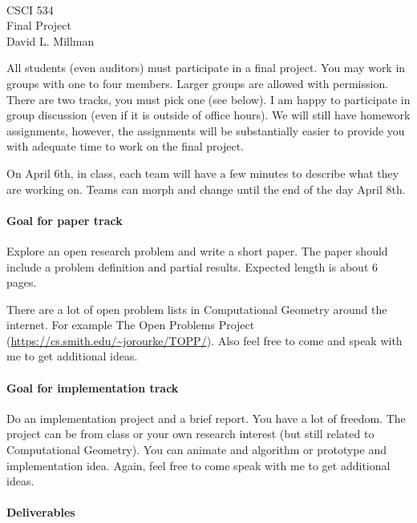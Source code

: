 \documentclass[11pt]{article}
\newcommand{\course}{CSCI 534}
\newcommand{\proj}{Final Project}
\newcommand{\instructor}{David L. Millman}
\begin{document}
{ ~\\
    \course \\ 
    \proj \\ 
    \instructor
    \vspace{1em}
}

All students (even auditors) must participate in a final project.  You may work
in groups with one to four members. Larger groups are allowed with permission.
There are two tracks, you must pick one (see below).  I am happy to participate
in group discussion (even if it is outside of office hours).  We will still have
homework assignments, however, the assignments will be substantially easier to
provide you with adequate time to work on the final project.

On April 6th, in class, each team will have a few minutes to describe what they
are working on. Teams can morph and change until the end of the day April 8th.

\paragraph{Goal for paper track} Explore an open research problem and write a
short paper.  The paper should include a problem definition and partial results.
Expected length is about 6 pages.

There are a lot of open problem lists in Computational Geometry around the
internet.  For example The Open Problems Project
(\url{https://cs.smith.edu/~jorourke/TOPP/}). Also feel free to come and speak
with me to get additional ideas.


\paragraph{Goal for implementation track} Do an implementation project and a
brief report.  You have a lot of freedom.  The project can be from class or your
own research interest (but still related to Computational Geometry).  You can
animate and algorithm or prototype and implementation idea.  Again, feel free
to come speak with me to get additional ideas.

\paragraph{Deliverables}
\end{document}
